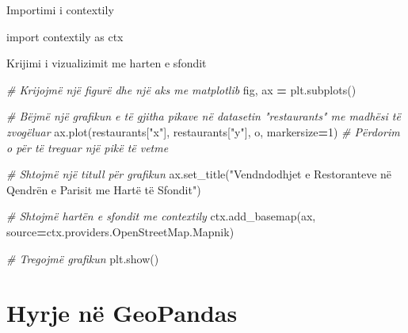 \documentclass[
  ignorenonframetext,
]{beamer}
\newenvironment{Shaded}{\begin{snugshade}}{\end{snugshade}}
\newcommand{\CommentTok}[1]{\textcolor[rgb]{0.56,0.35,0.01}{\textit{#1}}}
\newcommand{\DecValTok}[1]{\textcolor[rgb]{0.00,0.00,0.81}{#1}}
\newcommand{\ImportTok}[1]{#1}
\newcommand{\NormalTok}[1]{#1}
\newcommand{\OperatorTok}[1]{\textcolor[rgb]{0.81,0.36,0.00}{\textbf{#1}}}
\newcommand{\StringTok}[1]{\textcolor[rgb]{0.31,0.60,0.02}{#1}}
\begin{document}
\begin{frame}[fragile]{Importimi i contextily}
\protect\hypertarget{importimi-i-contextily}{}

\begin{Shaded}
\begin{Highlighting}[]
\ImportTok{import}\NormalTok{ contextily }\ImportTok{as}\NormalTok{ ctx}
\end{Highlighting}
\end{Shaded}
\end{frame}

\begin{frame}[fragile]{Krijimi i vizualizimit me harten e sfondit}
\protect\hypertarget{krijimi-i-vizualizimit-me-harten-e-sfondit}{}

\begin{Shaded}
\begin{Highlighting}[]
\CommentTok{\# Krijojmë një figurë dhe një aks me matplotlib}
\NormalTok{fig, ax }\OperatorTok{=}\NormalTok{ plt.subplots()}

\CommentTok{\# Bëjmë një grafikun e të gjitha pikave në datasetin "restaurants" me madhësi të zvogëluar}
\NormalTok{ax.plot(restaurants[}\StringTok{"x"}\NormalTok{], restaurants[}\StringTok{"y"}\NormalTok{], }\StringTok{\textquotesingle{}o\textquotesingle{}}\NormalTok{, markersize}\OperatorTok{=}\DecValTok{1}\NormalTok{)  }\CommentTok{\# Përdorim \textquotesingle{}o\textquotesingle{} për të treguar një pikë të vetme}

\CommentTok{\# Shtojmë një titull për grafikun}
\NormalTok{ax.set\_title(}\StringTok{"Vendndodhjet e Restoranteve në Qendrën e Parisit me Hartë të Sfondit"}\NormalTok{)}

\CommentTok{\# Shtojmë hartën e sfondit me contextily}
\NormalTok{ctx.add\_basemap(ax, source}\OperatorTok{=}\NormalTok{ctx.providers.OpenStreetMap.Mapnik)}

\CommentTok{\# Tregojmë grafikun}
\NormalTok{plt.show()}
\end{Highlighting}
\end{Shaded}
\end{frame}

\hypertarget{hyrje-nuxeb-geopandas}{%
\section{Hyrje në GeoPandas}\label{hyrje-nuxeb-geopandas}}
\end{document}
